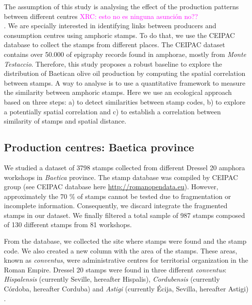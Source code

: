 \documentclass[review]{elsarticle}
\newcommand{\memo}[2]{\textcolor{#1}{#2}}
\newcommand{\xavi}[1]{\memo{magenta}{XRC: #1\\}}
\begin{document}
The assumption of this study is analysing the effect of the production patterns between different centres \xavi{esto no es ninguna asunción no??}. We are specially interested in identifying links between producers and consumption centres using amphoric stamps. To do that, we use the CEIPAC database to collect the stamps from different places. The CEIPAC dataset contains over 50.000 of epigraphy records found in amphorae, mostly from \textit{Monte Testaccio}. Therefore, this study proposes a robust baseline to explore the distribution of Baetican olive oil production by computing the spatial correlation between stamps. A way to analyse is to use a quantitative framework to measure the similarity between amphoric stamps. Here we use an ecological approach based on three steps: a) to detect similarities between stamp codes, b) to explore a potentially spatial correlation and c) to establish a correlation between similarity of stamps and spatial distance. 

\subsection{Production centres: Baetica province}

We studied a dataset of 3798 stamps collected from different Dressel 20 amphora workshops in \textit{Baetica} province. The stamp database was compiled by CEIPAC group \citep{remesal_centro_2015} (see CEIPAC database here \url{http://romanopendata.eu}). However, approximately the 70 \% of stamps cannot be tested due to fragmentation or incomplete information. Consequently, we discard integrate the fragmented stamps in our dataset. We finally filtered a total sample of 987 stamps composed of 130 different stamps from 81 workshops. 



From the database, we collected the site where stamps were found and the stamp code. We also created a new column with the area of the stamps. These areas, known as \textit{conventus}, were administrative centres for territorial organization in the Roman Empire. Dressel 20 stamps were found in three different \textit{conventus}: \textit{Hispalensis} (currently Seville, hereafter Hispalis), \textit{Cordubensis} (currently C\'ordoba, hereafter Corduba) and \textit{Astigi} (currently Écija, Sevilla, hereafter Astigi) \citep{rodriguez_economioleicola_1977,
chicdatos2001,berni_millet_epigrafianforica_2008} .
\end{document}
